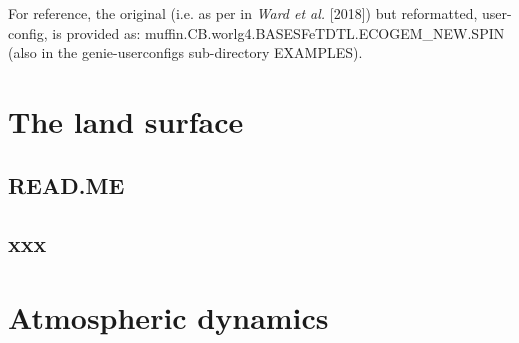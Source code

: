 \documentclass[11pt,fleqn]{book} %
\begin{document}
\vspace{1mm}
\noindent For reference, the original (i.e. as per in \textit{Ward et al.} [2018]) but reformatted, user-config, is provided as: \textsf{\footnotesize muffin.CB.worlg4.BASESFeTDTL.ECOGEM\_NEW.SPIN} (also in the \textsf{\footnotesize genie-userconfigs} sub-directory \textsf{\footnotesize EXAMPLES}).


\cleardoublepage


\chapter{The land surface}\label{ch:land-surface}

\hfill \break

\vspace{24mm}

\noindent


\newpage


\section*{READ.ME}



\newpage


\section{xxx}


%

\cleardoublepage


\chapter{Atmospheric dynamics}\label{ch:atmospheric-dynamics}
\end{document}
